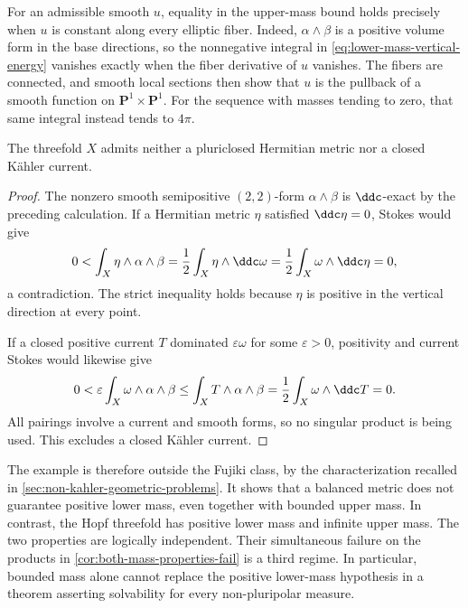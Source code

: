 For an admissible smooth $u$, equality in the upper-mass bound holds precisely when $u$ is constant along every elliptic fiber. Indeed, $\alpha\wedge\beta$ is a positive volume form in the base directions, so the nonnegative integral in \eqref{eq:lower-mass-vertical-energy} vanishes exactly when the fiber derivative of $u$ vanishes. The fibers are connected, and smooth local sections then show that $u$ is the pullback of a smooth function on $\mathbf P^1\times\mathbf P^1$. For the sequence with masses tending to zero, that same integral instead tends to $4\pi$.

\begin{proposition}\label{prop:lower-mass-no-pluriclosed}
The threefold $X$ admits neither a pluriclosed Hermitian metric nor a closed K\"ahler current.
\end{proposition}
\begin{proof}
The nonzero smooth semipositive $(2,2)$-form $\alpha\wedge\beta$ is $\ddc$-exact by the preceding calculation. If a Hermitian metric $\eta$ satisfied $\ddc\eta=0$, Stokes would give
\[
 0<\int_X\eta\wedge\alpha\wedge\beta
   =\frac12\int_X\eta\wedge\ddc\omega
   =\frac12\int_X\omega\wedge\ddc\eta=0,
\]
a contradiction. The strict inequality holds because $\eta$ is positive in the vertical direction at every point.

If a closed positive current $T$ dominated $\varepsilon\omega$ for some $\varepsilon>0$, positivity and current Stokes would likewise give
\[
 0<\varepsilon\int_X\omega\wedge\alpha\wedge\beta
 \leq\int_XT\wedge\alpha\wedge\beta
 =\frac12\int_X\omega\wedge\ddc T=0.
\]
All pairings involve a current and smooth forms, so no singular product is being used. This excludes a closed K\"ahler current.
\end{proof}

The example is therefore outside the Fujiki class, by the characterization recalled in \cref{sec:non-kahler-geometric-problems}. It shows that a balanced metric does not guarantee positive lower mass, even together with bounded upper mass. In contrast, the Hopf threefold has positive lower mass and infinite upper mass. The two properties are logically independent. Their simultaneous failure on the products in \cref{cor:both-mass-properties-fail} is a third regime. In particular, bounded mass alone cannot replace the positive lower-mass hypothesis in a theorem asserting solvability for every non-pluripolar measure.
